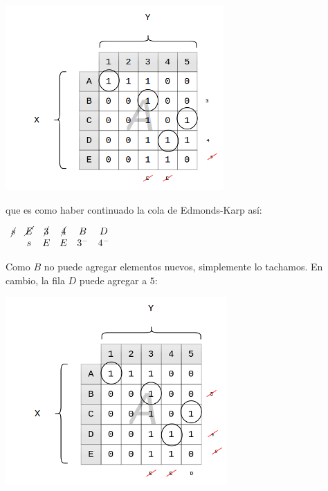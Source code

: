 \documentclass[10pt,a4paper]{article}
\begin{document}
\begin{center}

    \begin{adjustbox}{max size={\textwidth}{\textheight}}
        \includegraphics{definitions/matching_10.jpg}
        \end{adjustbox}
    
\end{center}

que es como haber continuado la cola de Edmonds-Karp así:

\begin{center}
$\begin{array}{cccccc} \cancel{s}& \cancel{E} & \cancel{3} & \cancel{4} & B & D \\ & s & E & E & 3^- & 4^- \end{array}$
\end{center}

Como $B$ no puede agregar elementos nuevos, simplemente lo tachamos. En cambio, la fila $D$ puede agregar a $5$:

\begin{center}

    \begin{adjustbox}{max size={\textwidth}{\textheight}}
        \includegraphics{definitions/matching_11.jpg}
        \end{adjustbox}
    
\end{center}
\end{document}
